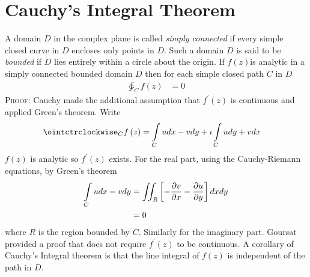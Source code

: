 \documentclass[a4paper,twoside,10pt,english]{report}
\begin{document}
\section{\label{app:Cauchys-Integral-Theorem}Cauchy's Integral Theorem}
A domain $D$ in the complex plane is called \emph{simply connected}
if every simple closed curve in $D$ encloses only points in $D$.
Such a domain $D$ is said to be \emph{bounded} if $D$ lies entirely
within a circle about the origin. If $f\left(z\right)$is analytic in a simply
connected bounded domain $D$ then for each simple closed path $C$
in $D$ 
\begin{align*}
\ointctrclockwise_{C}f\left(z\right) & = 0
\end{align*}
\textsc{Proof:}
Cauchy made the additional assumption that $f^{\prime}\left(z\right)$
is continuous and applied Green's theorem. Write
\begin{align*}
\ointctrclockwise_{C}f\left(z\right) & = \intop_{C}udx-vdy+\imath\intop_{C}udy+vdx
\end{align*}
$f\left(z\right)$ is analytic so $f^{\prime}\left(z\right)$ exists.
For the real part, using the Cauchy-Riemann equations, by Green's
theorem
\begin{align*}
\intop_{C}udx-vdy & = \iint_{R}\left[-\frac{\partial v}{\partial x}-\frac{\partial u}{\partial y}\right]dxdy\\
 & = 0
\end{align*}
 where $R$ is the region bounded by $C$. Similarly for the imaginary
part. Goursat provided a proof that does not require $f^{\prime}\left(z\right)$
to be continuous. A corollary of Cauchy's Integral theorem is that
the line integral of $f\left(z\right)$ is independent of the path in $D$.
\end{document}
